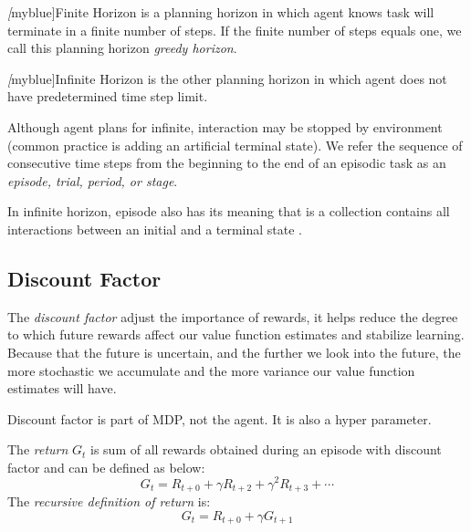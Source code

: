 \emph[myblue]{Finite Horizon} is a planning horizon in which agent knows task will terminate in a finite number of
steps. If the finite number of steps equals one, we call this planning horizon {\itshape greedy horizon}.\par
\emph[myblue]{Infinite Horizon} is the other planning horizon in which agent does not have predetermined time step
limit.\par Although agent plans for infinite, interaction may be stopped by environment (common practice is adding an
artificial terminal state). We refer the sequence of consecutive time steps from the beginning to the end of an episodic
task as an \emph{episode, trial, period, or stage}.\par In
infinite horizon, episode also has its meaning that is a collection contains all interactions between an initial and a
terminal state .

\subsection{Discount Factor}

The \emph{discount factor} adjust the importance of rewards, it helps reduce the degree to which future rewards affect
our value function estimates and stabilize learning. Because that the future is uncertain, and the further we look into
the future, the more stochastic we accumulate and the more variance our value function estimates will have. \par

Discount factor is part of MDP, not the agent. It is also a hyper parameter.

The \emph{return} $G_t$ is sum of all rewards obtained during an episode with discount factor and can be defined as
below:
\begin{equation}
  G_t=R_{t+0}+ \gamma R_{t+2} + \gamma^2 R_{t+3} + \cdots
\end{equation}
The \emph{recursive definition of return} is:
\begin{equation}
  G_t = R_{t+0}+\gamma G_{t+1}
\end{equation}
